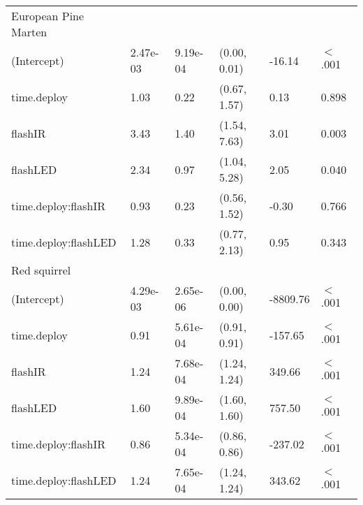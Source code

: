 \begin{table}[ht]
\begin{tabular}{llllll}
  European Pine Marten &  &  &  &  &        \\ 
  (Intercept) & 2.47e-03 & 9.19e-04 & (0.00, 0.01) & -16.14 & $<$ .001 \\ 
  time.deploy & 1.03 & 0.22 & (0.67, 1.57) & 0.13 & 0.898  \\ 
  flashIR & 3.43 & 1.40 & (1.54, 7.63) & 3.01 & 0.003  \\ 
  flashLED & 2.34 & 0.97 & (1.04, 5.28) & 2.05 & 0.040  \\ 
  time.deploy:flashIR & 0.93 & 0.23 & (0.56, 1.52) & -0.30 & 0.766  \\ 
  time.deploy:flashLED & 1.28 & 0.33 & (0.77, 2.13) & 0.95 & 0.343  \\ 
  Red squirrel &  &  &  &  &        \\ 
  (Intercept) & 4.29e-03 & 2.65e-06 & (0.00, 0.00) & -8809.76 & $<$ .001 \\ 
  time.deploy & 0.91 & 5.61e-04 & (0.91, 0.91) & -157.65 & $<$ .001 \\ 
  flashIR & 1.24 & 7.68e-04 & (1.24, 1.24) & 349.66 & $<$ .001 \\ 
  flashLED & 1.60 & 9.89e-04 & (1.60, 1.60) & 757.50 & $<$ .001 \\ 
  time.deploy:flashIR & 0.86 & 5.34e-04 & (0.86, 0.86) & -237.02 & $<$ .001 \\ 
  time.deploy:flashLED & 1.24 & 7.65e-04 & (1.24, 1.24) & 343.62 & $<$ .001 \\ 
   \hline
\end{tabular}
\end{table}
